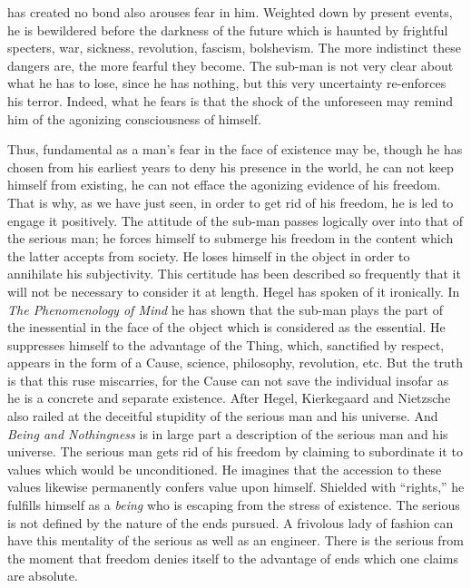 \documentclass[11pt]{article}
\begin{document}
has created no bond also arouses fear in him. Weighted down by present events, he is bewildered before the darkness of the future which is haunted by frightful specters, war, sickness, revolution, fascism, bolshevism. The more indistinct these dangers are, the more fearful they become. The sub-man is not very clear about what he has to lose, since he has nothing, but this very uncertainty re-enforces his terror. Indeed, what he fears is that the shock of the unforeseen may remind him of the agonizing consciousness of himself.

Thus, fundamental as a man’s fear in the face of existence may be, though he has chosen from his earliest years to deny his presence in the world, he can not keep himself from existing, he can not efface the agonizing evidence of his freedom. That is why, as we have just seen, in order to get rid of his freedom, he is led to engage it positively. The attitude of the sub-man passes logically over into that of the serious man; he forces himself to submerge his freedom in the content which the latter accepts from society. He loses himself in the object in order to annihilate his subjectivity. This certitude has been described so frequently that it will not be necessary to consider it at length. Hegel has spoken of it ironically. In \textit{The Phenomenology of Mind} he has shown that the sub-man plays the part of the inessential in the face of the object which is considered as the essential. He suppresses himself to the advantage of the Thing, which, sanctified by respect, appears in the form of a Cause, science, philosophy, revolution, etc. But the truth is that this ruse miscarries, for the Cause can not save the individual insofar as he is a concrete and separate existence. After Hegel, Kierkegaard and Nietzsche also railed at the deceitful stupidity of the serious man and his universe. And \textit{Being and Nothingness} is in large part a description of the serious man and his universe. The serious man gets rid of his freedom by claiming to subordinate it to values which would be unconditioned. He imagines that the accession to these values likewise permanently confers value upon himself. Shielded with “rights,” he fulfills himself as a \textit{being} who is escaping from the stress of existence. The serious is not defined by the nature of the ends pursued. A frivolous lady of fashion can have this mentality of the serious as well as an engineer. There is the serious from the moment that freedom denies itself to the advantage of ends which one claims are absolute.
\end{document}
